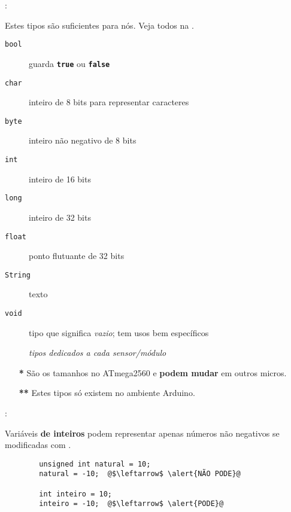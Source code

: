 \begin{frame}{\insertsection: \insertsubsection}

	Estes tipos são suficientes para nós. Veja todos na .

	\begin{description}
		\item[\texttt{bool}] guarda \textbf{\texttt{true}} ou \textbf{\texttt{false}}
		\item[\texttt{char}] inteiro de 8 bits para representar caracteres
		\item[\texttt{byte}] inteiro não negativo de 8 bits\Highlight{**}
		\item[\texttt{int}] inteiro de 16 bits\Highlight{*}
		\item[\texttt{long}] inteiro de 32 bits\Highlight{*}
		\item[\texttt{float}] ponto flutuante de 32 bits
		\item[\texttt{String}] texto\Highlight{**}
		\item[\texttt{void}] tipo que significa \emph{vazio}; tem usos bem específicos
		\item[\texttt{\textellipsis}] \emph{tipos dedicados a cada sensor/módulo}
	\end{description}

	\vfill
	\begin{itemize}
		\item[\textbf{*}] São os tamanhos no ATmega2560 e \textbf{podem mudar} em outros micros.
		\item[\textbf{**}] Estes tipos só existem no ambiente Arduino.
	\end{itemize}

\end{frame}


\begin{frame}[fragile]{\insertsection: \insertsubsection}

	Variáveis \textbf{de inteiros} podem representar apenas números não negativos se modificadas com \texttt{}.
	\begin{verbatim}
		unsigned int natural = 10;
		natural = -10;  @$\leftarrow$ \alert{NÃO PODE}@

		int inteiro = 10;
		inteiro = -10;  @$\leftarrow$ \alert{PODE}@
	\end{verbatim}

\end{frame}


